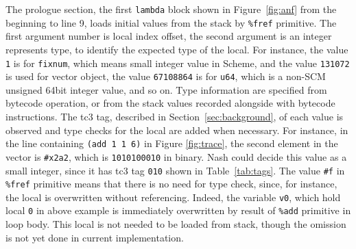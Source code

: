 \documentclass[preprint, numbers]{sigplanconf}
\begin{document}
The prologue section, the first \texttt{lambda} block shown in
Figure~\hyperref[fig:anf]{\ref{fig:anf}} from the beginning to line 9, loads
initial values from the stack by \texttt{\%fref} primitive. The first argument
number is local index offset, the second argument is an integer represents
type, to identify the expected type of the local. For instance, the value
\texttt{1} is for \texttt{fixnum}, which means small integer value in Scheme,
and the value \texttt{131072} is used for vector object, the value
\texttt{67108864} is for \texttt{u64}, which is a non-SCM unsigned 64bit
integer value, and so on. Type information are specified from bytecode
operation, or from the stack values recorded alongside with bytecode
instructions. The tc3 tag, described in Section~\ref{sec:background}, of each
value is observed and type checks for the local are added when necessary. For
instance, in the line containing \texttt{(add 1 1 6)} in Figure
\hyperref[fig:trace]{\ref{fig:trace}}, the second element in the vector is
\texttt{\#x2a2}, which is \texttt{1010100010} in binary. Nash could decide
this value as a small integer, since it has tc3 tag \texttt{010} shown in
Table~\hyperref[tab:tags]{\ref{tab:tags}}. The value \texttt{\#f} in
\texttt{\%fref} primitive means that there is no need for type check, since,
for instance, the local is overwritten without referencing. Indeed, the
variable \texttt{v0}, which hold local \texttt{0} in above example is
immediately overwritten by result of \texttt{\%add} primitive in loop
body. This local is not needed to be loaded from stack, though the omission is
not yet done in current implementation.
\end{document}
